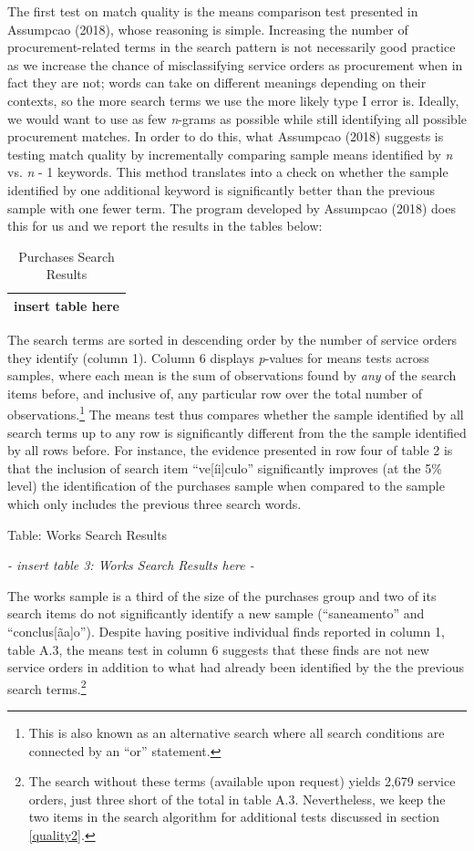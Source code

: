 \documentclass[]{article}
\let\rmarkdownfootnote\footnote%
\def\footnote{\protect\rmarkdownfootnote}
\theoremstyle{definition}
\theoremstyle{definition}
\theoremstyle{definition}
\theoremstyle{remark}
\begin{document}
The first test on match quality is the means comparison test presented
in Assumpcao (2018), whose reasoning is simple. Increasing the number of
procurement-related terms in the search pattern is not necessarily good
practice as we increase the chance of misclassifying service orders as
procurement when in fact they are not; words can take on different
meanings depending on their contexts, so the more search terms we use
the more likely type I error is. Ideally, we would want to use as few
\emph{n}-grams as possible while still identifying all possible
procurement matches. In order to do this, what Assumpcao (2018) suggests
is testing match quality by incrementally comparing sample means
identified by \emph{n} vs. \emph{n} - 1 keywords. This method translates
into a check on whether the sample identified by one additional keyword
is significantly better than the previous sample with one fewer term.
The program developed by Assumpcao (2018) does this for us and we report
the results in the tables below:

\begin{longtable}[]{@{}c@{}}
\caption{\label{tab:taba3} Purchases Search Results}\tabularnewline
\toprule
\endhead
insert table here\tabularnewline
\bottomrule
\end{longtable}

The search terms are sorted in descending order by the number of service
orders they identify (column 1). Column 6 displays \emph{p}-values for
means tests across samples, where each mean is the sum of observations
found by \emph{any} of the search items before, and inclusive of, any
particular row over the total number of observations.\footnote{This is
  also known as an alternative search where all search conditions are
  connected by an ``or'' statement.} The means test thus compares
whether the sample identified by all search terms up to any row is
significantly different from the the sample identified by all rows
before. For instance, the evidence presented in row four of table 2 is
that the inclusion of search item ``ve{[}íi{]}culo'' significantly
improves (at the 5\% level) the identification of the purchases sample
when compared to the sample which only includes the previous three
search words.

Table: \label{tab:taba3} Works Search Results

\emph{- insert table 3: Works Search Results here -}

The works sample is a third of the size of the purchases group and two
of its search items do not significantly identify a new sample
(``saneamento'' and ``conclus{[}ãa{]}o''). Despite having positive
individual finds reported in column 1, table A.3, the means test in
column 6 suggests that these finds are not new service orders in
addition to what had already been identified by the the previous search
terms.\footnote{The search without these terms (available upon request)
  yields 2,679 service orders, just three short of the total in table
  A.3. Nevertheless, we keep the two items in the search algorithm for
  additional tests discussed in section \ref{quality2}.}
\end{document}
